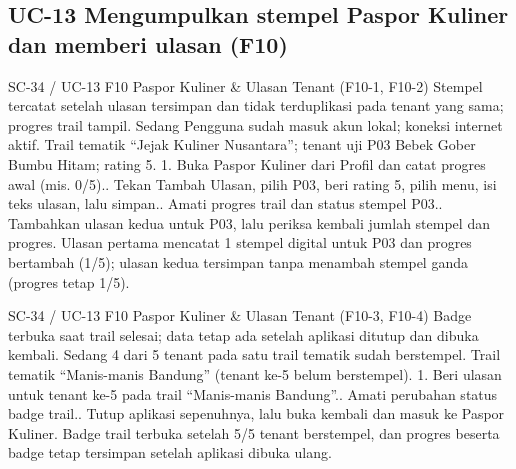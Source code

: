 \subsection*{UC-13 Mengumpulkan stempel Paspor Kuliner dan memberi ulasan (F10)}

\renewcommand{\tcactual}{Sesuai ekspektasi pada perangkat Android (Lolos via \texttt{09-passport} (10/10), \texttt{passport.test} (10/10), \texttt{reviews.test} (16/16)). Ulasan pertama mencatat 1 stempel digital untuk P03 dan progres bertambah (1/5); ulasan kedua tersimpan tanpa menambah stempel ganda (progres tetap 1/5).}
{SC-34 / UC-13}
{F10 Paspor Kuliner \& Ulasan Tenant}
{(F10-1, F10-2) Stempel tercatat setelah ulasan tersimpan dan tidak terduplikasi pada tenant yang sama; progres trail tampil.}
{Sedang}
{Pengguna sudah masuk akun lokal; koneksi internet aktif.}
{Trail tematik ``Jejak Kuliner Nusantara''; tenant uji P03 Bebek Gober Bumbu Hitam; rating 5.}
{1. Buka Paspor Kuliner dari Profil dan catat progres awal (mis. 0/5).. Tekan Tambah Ulasan, pilih P03, beri rating 5, pilih menu, isi teks ulasan, lalu simpan.. Amati progres trail dan status stempel P03.. Tambahkan ulasan kedua untuk P03, lalu periksa kembali jumlah stempel dan progres.}
{Ulasan pertama mencatat 1 stempel digital untuk P03 dan progres bertambah (1/5); ulasan kedua tersimpan tanpa menambah stempel ganda (progres tetap 1/5).}

\renewcommand{\tcactual}{Sesuai ekspektasi pada perangkat Android (Lolos via \texttt{09-passport} (10/10) \& \texttt{passport.test} (10/10)). Badge trail terbuka setelah 5/5 tenant berstempel, dan progres beserta badge tetap tersimpan setelah aplikasi dibuka ulang.}
{SC-34 / UC-13}
{F10 Paspor Kuliner \& Ulasan Tenant}
{(F10-3, F10-4) Badge terbuka saat trail selesai; data tetap ada setelah aplikasi ditutup dan dibuka kembali.}
{Sedang}
{4 dari 5 tenant pada satu trail tematik sudah berstempel.}
{Trail tematik ``Manis-manis Bandung'' (tenant ke-5 belum berstempel).}
{1. Beri ulasan untuk tenant ke-5 pada trail ``Manis-manis Bandung''.. Amati perubahan status badge trail.. Tutup aplikasi sepenuhnya, lalu buka kembali dan masuk ke Paspor Kuliner.}
{Badge trail terbuka setelah 5/5 tenant berstempel, dan progres beserta badge tetap tersimpan setelah aplikasi dibuka ulang.}

